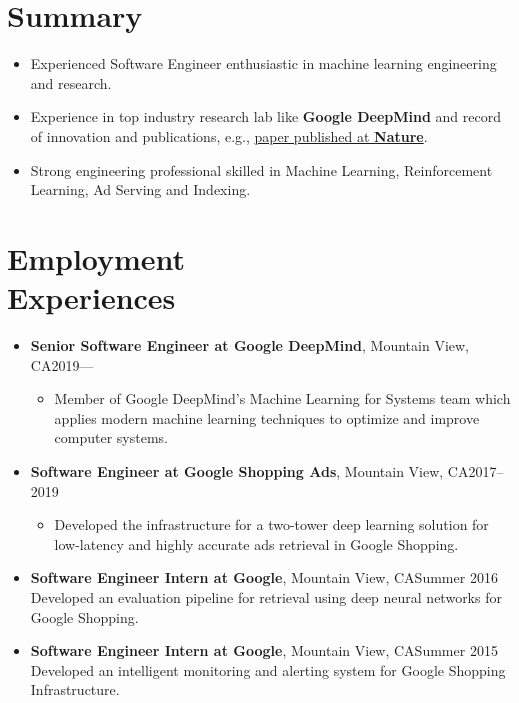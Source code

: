 \documentclass[overlapped]{res}
\begin{document}

\address{
 \href{mailto:e.songhori@gmail.com }{e.songhori(at)gmail.com}\\
 \href{https://www.linkedin.com/in/esonghori/}{linkedin.com/in/esonghori/}\\
 \href{https://github.com/esonghori}{github.com/esonghori}
}

\begin{resume}

\section{Summary}
\begin{itemize}
\item {Experienced Software Engineer enthusiastic in machine learning engineering and research.}
\item {Experience in top industry research lab like {\bf Google DeepMind} and record of innovation and publications, e.g., \href{https://www.nature.com/articles/s41586-021-03544-w}{paper published at {\bf Nature}}.}
\item {Strong engineering professional skilled in Machine Learning, Reinforcement Learning, Ad Serving and Indexing.}
\end{itemize}
\section{Employment\\ Experiences}
\begin{itemize}
\item {\bf Senior Software Engineer at Google DeepMind}, Mountain View, CA\hfill 2019---
\begin{itemize}
\item{Member of Google DeepMind's Machine Learning for Systems team which applies modern machine learning techniques to optimize and improve computer systems.}
\end{itemize}
\item {\bf Software Engineer at Google Shopping Ads}, Mountain View, CA\hfill 2017--2019
\begin{itemize}
\item{Developed the infrastructure for a two-tower deep learning solution for low-latency and highly accurate ads retrieval in Google Shopping.}
\end{itemize}
\item {\bf Software Engineer Intern at Google}, Mountain View, CA\hfill Summer 2016\\
Developed an evaluation pipeline for retrieval using deep neural networks  for Google Shopping.
\item {\bf Software Engineer Intern at Google}, Mountain View, CA\hfill Summer 2015\\
Developed an intelligent monitoring and alerting system for Google Shopping Infrastructure.
\end{itemize}


\end{resume}
\end{document}
